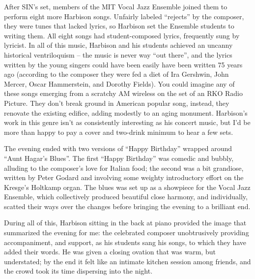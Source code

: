 After SIN’s set, members of the MIT Vocal Jazz Ensemble joined them to perform eight more Harbison songs. Unfairly labeled “rejects” by the composer, they were tunes that lacked lyrics, so Harbison set the Ensemble students to writing them. All eight songs had student-composed lyrics, frequently sung by lyricist. In all of this music, Harbison and his students achieved an uncanny historical ventriloquism – the music is never way “out there”, and the lyrics written by the young singers could have been easily have been written 75 years ago (according to the composer they were fed a diet of Ira Gershwin, John Mercer, Oscar Hammerstein, and Dorothy Fields). You could imagine any of these songs emerging from a scratchy AM wireless on the set of an RKO Radio Picture. They don’t break ground in American popular song, instead, they renovate the existing edifice, adding modestly to an aging monument. Harbison’s work in this genre isn’t as consistently interesting as his concert music, but I’d be more than happy to pay a cover and two-drink minimum to hear a few sets.

The evening ended with two versions of “Happy Birthday” wrapped around “Aunt Hagar’s Blues”. The first “Happy Birthday” was comedic and bubbly, alluding to the composer’s love for Italian food; the second was a bit grandiose, written by Peter Godard and involving some weighty introductory effort on the Kresge’s Holtkamp organ. The blues was set up as a showpiece for the Vocal Jazz Ensemble, which collectively produced beautiful close harmony, and individually, scatted their ways over the changes before bringing the evening to a brilliant end.

During all of this, Harbison sitting in the back at piano provided the image that summarized the evening for me: the celebrated composer unobtrusively providing accompaniment, and support, as his students sang his songs, to which they have added their words. He was given a closing ovation that was warm, but understated; by the end it felt like an intimate kitchen session among friends, and the crowd took its time dispersing into the night.
